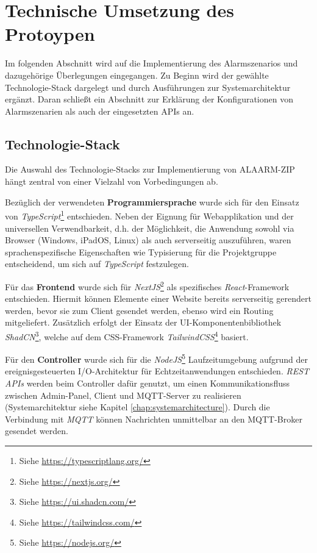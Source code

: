 \section{Technische Umsetzung des Protoypen}

Im folgenden Abschnitt wird auf die Implementierung des Alarmszenarios und dazugehörige Überlegungen eingegangen. Zu Beginn wird der gewählte Technologie-Stack dargelegt und durch Ausführungen zur Systemarchitektur ergänzt. 
Daran schließt ein Abschnitt zur Erklärung der Konfigurationen von Alarmszenarien als auch der eingesetzten APIs an.

\subsection{Technologie-Stack}

Die Auswahl des Technologie-Stacks zur Implementierung von ALAARM-ZIP hängt zentral von einer Vielzahl von Vorbedingungen ab.


Bezüglich der verwendeten \textbf{Programmiersprache} wurde sich für den Einsatz von \textit{TypeScript}\footnote{Siehe \href{https://typescriptlang.org/}{https://typescriptlang.org/}} entschieden. Neben der Eignung für Webapplikation und der universellen Verwendbarkeit, d.h. der Möglichkeit, die Anwendung sowohl via Browser (Windows, iPadOS, Linux) als auch serverseitig auszuführen,  waren sprachenspezifische Eigenschaften wie Typisierung für die Projektgruppe entscheidend, um sich auf \textit{TypeScript} festzulegen.

Für das \textbf{Frontend} wurde sich für \textit{NextJS}\footnote{Siehe \href{https://nextjs.org/}{https://nextjs.org/}} als spezifisches \textit{React}-Framework entschieden. Hiermit können Elemente einer Website bereits serverseitig gerendert werden, bevor sie zum Client gesendet werden, ebenso wird ein Routing mitgeliefert. Zusätzlich erfolgt der Einsatz der UI-Komponentenbibliothek \textit{ShadCN}\footnote{Siehe \href{https://ui.shadcn.com/}{https://ui.shadcn.com/}}, welche auf dem CSS-Framework \textit{TailwindCSS}\footnote{Siehe \href{https://tailwindcss.com/}{https://tailwindcss.com/}} basiert. 

Für den \textbf{Controller} wurde sich für die \textit{NodeJS}\footnote{Siehe \href{https://nodejs.org/}{https://nodejs.org/}} Laufzeitumgebung aufgrund der ereignisgesteuerten I/O-Architektur für Echtzeitanwendungen entschieden. \textit{REST APIs} werden beim Controller dafür genutzt, um einen Kommunikationsfluss zwischen Admin-Panel, Client und MQTT-Server zu realisieren (Systemarchitektur siehe Kapitel \ref{chap:systemarchitecture}). Durch die Verbindung mit \textit{MQTT} können Nachrichten unmittelbar an den MQTT-Broker gesendet werden.

